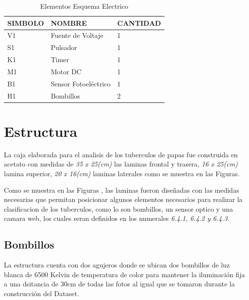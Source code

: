 		\begin{table}[ht]
		\centering
		\begin{tabular}{|p{2cm}|p{5cm}||p{3cm}|}
			\hline
			SIMBOLO & NOMBRE & CANTIDAD \\ 
			\hline
			 V1 & Fuente de Voltaje & 1 \\
			\hline
			 S1 & Pulsador & 1 \\
			\hline
			 K1 & Timer & 1 \\
			\hline
			 M1 & Motor DC & 1 \\
			\hline
			 B1 & Sensor Fotoeléctrico & 1 \\
			\hline
			 H1 & Bombillos & 2 \\
			\hline
		\end{tabular}	
		\caption{Elementos Esquema Electrico}
		\label{table:esquema}
		\end{table}	
		
\newpage	
	\section{Estructura}
		La caja elaborada para el analisis de los tuberculos de papas fue construida en acetato con medidas de \textit{35 x 25(cm)} las laminas frontal y trasera, \textit{16 x 25(cm)} lamina superior, \textit{20 x 16(cm)} laminas laterales como se muestra en las Figuras.
	
		Como se muestra en las Figuras , las laminas fueron diseñadas con las medidas necesarias que permitan posicionar algunos elementos necesarios para realizar la clasificacion de los tuberculos, como lo son bombillos, un sensor optico y una camara web, los cuales seran definidos en los numerales \textit{6.4.1, 6.4.2 y 6.4.3}.
		\subsection{Bombillos}
			La estructura cuenta con dos agujeros donde se ubican dos bombillos de luz blanca de 6500 Kelvin de temperatura de color para mantener la iluminación fija a una dsitancia de 30cm de todas las fotos al igual que se tomaron durante la construcción del Dataset.
